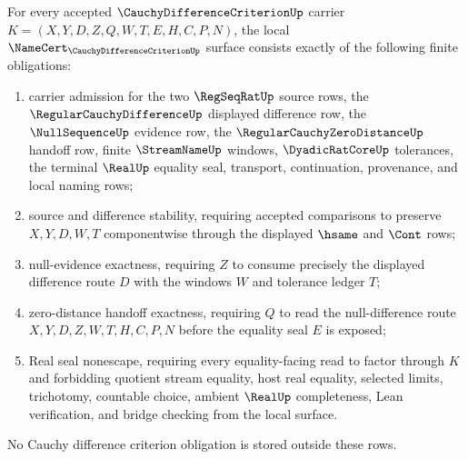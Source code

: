 \begin{theorem}
\label{thm:cauchy-difference-criterion-namecert-obligations}
For every accepted $\CauchyDifferenceCriterionUp$ carrier $K=(X,Y,D,Z,Q,W,T,E,H,C,P,N)$, the local $\NameCert_{\CauchyDifferenceCriterionUp}$ surface consists exactly of the following finite obligations:
\begin{enumerate}
\item carrier admission for the two $\RegSeqRatUp$ source rows, the $\RegularCauchyDifferenceUp$ displayed difference row, the $\NullSequenceUp$ evidence row, the $\RegularCauchyZeroDistanceUp$ handoff row, finite $\StreamNameUp$ windows, $\DyadicRatCoreUp$ tolerances, the terminal $\RealUp$ equality seal, transport, continuation, provenance, and local naming rows;
\item source and difference stability, requiring accepted comparisons to preserve $X,Y,D,W,T$ componentwise through the displayed $\hsame$ and $\Cont$ rows;
\item null-evidence exactness, requiring $Z$ to consume precisely the displayed difference route $D$ with the windows $W$ and tolerance ledger $T$;
\item zero-distance handoff exactness, requiring $Q$ to read the null-difference route $X,Y,D,Z,W,T,H,C,P,N$ before the equality seal $E$ is exposed;
\item Real seal nonescape, requiring every equality-facing read to factor through $K$ and forbidding quotient stream equality, host real equality, selected limits, trichotomy, countable choice, ambient $\RealUp$ completeness, Lean verification, and bridge checking from the local surface.
\end{enumerate}
No Cauchy difference criterion obligation is stored outside these rows.
\end{theorem}
